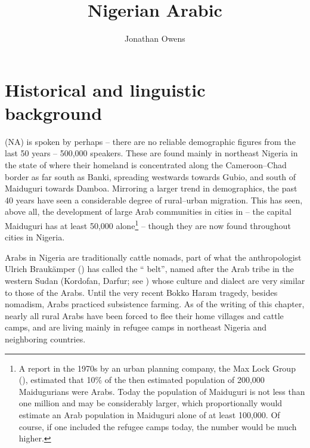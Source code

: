 \documentclass[output=paper]{langsci/langscibook}
\author{Jonathan Owens\affiliation{University of Bayreuth}}
\title{Nigerian Arabic}
\begin{document}
\section{
Historical and linguistic background
}

  (NA) is spoken by perhaps – there are no reliable demographic figures from the last 50 years – 500,000 speakers. These are found mainly in northeast Nigeria in the state of  where their homeland is concentrated along the Cameroon--Chad border as far south as Banki, spreading westwards towards Gubio, and south of Maiduguri towards Damboa. Mirroring a larger trend in  demographics, the past 40 years have seen a considerable degree of rural–urban migration. This has seen, above all, the development of large Arab communities in cities in  – the capital Maiduguri has at least 50,000 alone\footnote{A report in the 1970s by an urban planning company, the Max Lock Group (\citeyear{MaxLockGroup1976}), estimated that 10\% of the then estimated population of 200,000 Maidugurians were Arabs. Today the population of Maiduguri is not less than one million and may be considerably larger, which proportionally would estimate an Arab population in Maiduguri alone of at least 100,000. Of course, if one included the refugee camps today, the number would be much higher.} – though they are now found throughout cities in Nigeria.

Arabs in Nigeria are traditionally cattle nomads, part of what the anthropologist Ulrich Braukämper (\citeyear{Braukämper1994}) has called the “ belt”, named after the Arab tribe in the western Sudan (Kordofan, Darfur; see \citealt{Manfredi2010}) whose culture and dialect are very similar to those of the  Arabs. Until the very recent Bokko Haram tragedy, besides nomadism, Arabs practiced subsistence farming. As of the writing of this chapter, nearly all rural  Arabs have been forced to flee their home villages and cattle camps, and are living mainly in refugee camps in northeast Nigeria and neighboring countries.
\end{document}

